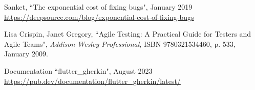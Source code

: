 \begin{thebibliography}{100}
\addtolength{\leftmargin}{0.2in}
\setlength{\itemindent}{-0.2in}


 Sanket, ``The exponential cost of fixing bugs", January 2019 
\href{https://deepsource.com/blog/exponential-cost-of-fixing-bugs}{https://deepsource.com/blog/exponential-cost-of-fixing-bugs}

 Lisa Crispin, Janet Gregory, ``Agile Testing: A Practical Guide for Testers and Agile 
Teams", \emph{Addison-Wesley Professional}, ISBN 9780321534460, p. 533, January 2009.

 Documentation ``flutter\_gherkin", August 2023
\href{https://pub.dev/documentation/flutter_gherkin/latest/}{https://pub.dev/documentation/flutter\_gherkin/latest/}

\end{thebibliography}
